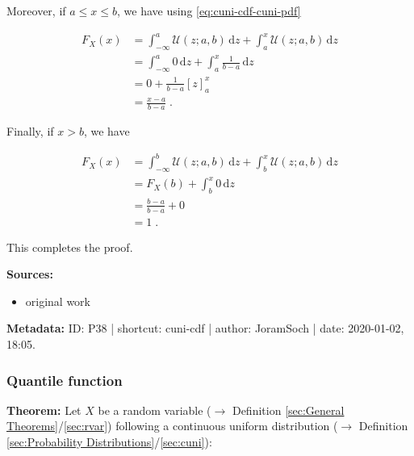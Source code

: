 \documentclass[a4paper,12pt,twoside]{book}
\begin{document}
Moreover, if $a \leq x \leq b$, we have using \eqref{eq:cuni-cdf-cuni-pdf}

\begin{equation} \label{eq:cuni-cdf-cuni-cdf-s2b}
\begin{split}
F_X(x) &= \int_{-\infty}^{a} \mathcal{U}(z; a, b) \, \mathrm{d}z + \int_{a}^{x} \mathcal{U}(z; a, b) \, \mathrm{d}z \\
&= \int_{-\infty}^{a} 0 \, \mathrm{d}z + \int_{a}^{x} \frac{1}{b-a} \, \mathrm{d}z \\
&= 0 + \frac{1}{b-a} [z]_a^x \\
&= \frac{x-a}{b-a} \; .
\end{split}
\end{equation}

Finally, if $x > b$, we have

\begin{equation} \label{eq:cuni-cdf-cuni-cdf-s2c}
\begin{split}
F_X(x) &= \int_{-\infty}^{b} \mathcal{U}(z; a, b) \, \mathrm{d}z + \int_{b}^{x} \mathcal{U}(z; a, b) \, \mathrm{d}z \\
&= F_X(b) + \int_{b}^{x} 0 \, \mathrm{d}z \\
&= \frac{b-a}{b-a} + 0 \\
&= 1 \; .
\end{split}
\end{equation}

This completes the proof.


\vspace{1em}
\textbf{Sources:}
\begin{itemize}
\item original work\end{itemize}


\vspace{1em}
\textbf{Metadata:} ID: P38 | shortcut: cuni-cdf | author: JoramSoch | date: 2020-01-02, 18:05.
\vspace{1em}



\subsubsection[\textbf{Quantile function}]{Quantile function} \label{sec:cuni-qf}
\setcounter{equation}{0}

\textbf{Theorem:} Let $X$ be a random variable ($\rightarrow$ Definition \ref{sec:General Theorems}/\ref{sec:rvar}) following a continuous uniform distribution ($\rightarrow$ Definition \ref{sec:Probability Distributions}/\ref{sec:cuni}):
\end{document}
